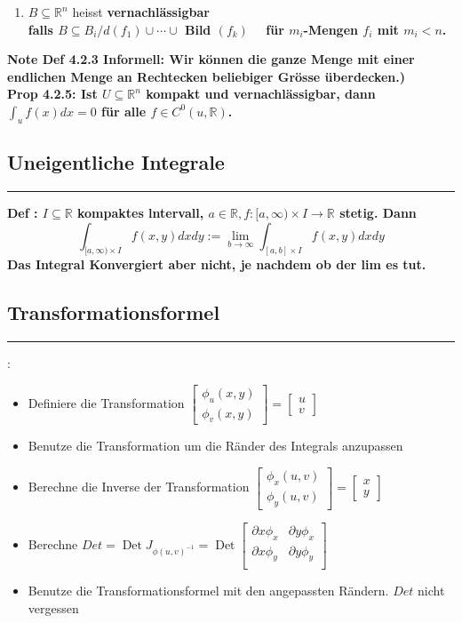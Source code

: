 \documentclass[7pt,landscape, margin = 0.1mm]{article}
\newcommand*{\mysubsection}[1]{\vspace{-2mm}\color{chaptercolor}\subsection{ #1 }
\vspace{-1mm}\hrule\vspace{1.5mm}\color{black}
\vspace{2mm}}
\newcommand{\COL}[1]{ \color{chaptercolor} \bf{#1}\color{black}     \\}
\newcommand{\KRZ}[2]{\vspace{1mm} \hline \vspace{1mm} \color{chaptercolor}{RC #1}:\color{black} \   \hspace{0.2cm}\vspace{1mm}   {\begin{minipage}{20em}
#2 \end{minipage}} \vspace{1mm}  \hline \vspace{1mm}  \\}
\newcommand{\DEF}[2]{\color{chaptercolor}\bf{Def #1}:\color{black}    \hspace{0.2cm} #2 \\}
\newcommand{\NOTE}[2]{\color{chaptercolor}\bf{Note #1}:\color{black}    \hspace{0.2cm} #2 \\}
\newcommand{\PROP}[2]{\color{chaptercolor}\bf{Prop #1}:\color{black}    \hspace{0.2cm} #2 \\}
\begin{document}
\begin{multicols}{4}
\begin{flushleft}
{\begin{enumerate}
 \item $B \subseteq \mathbb{R}^n$ heisst  \COL{vernachlässigbar} falls
 $B \subseteq B_i / d\left(f_1\right) \cup \cdots \cup$ Bild $\left(f_k\right) \quad$ für $m_i$-Mengen $f_i$ mit $m_i<n$.
\end{enumerate}
}

\NOTE{Def 4.2.3 Informell}{ Wir können die ganze Menge mit
einer endlichen Menge an Rechtecken beliebiger
Grösse überdecken.)}
\PROP{4.2.5}{ Ist $U \subseteq \mathbb{R}^n$ kompakt und vernachlässigbar, dann $\int_u f(x) d x=0$ für alle $f \in C^0(u, \mathbb{R})$.}

\mysubsection{Uneigentliche Integrale}



\DEF{}{ $I \subseteq \mathbb{R}$ kompaktes lntervall, $a \in \mathbb{R}, f:[a, \infty) \times I \rightarrow \mathbb{R}$ stetig. Dann
 $$
 \int_{[a, \infty) \times I} f(x, y) d x d y:=\lim _{b \rightarrow \infty} \int_{[a, b] \times I} f(x, y) d x d y
 $$
Das Integral Konvergiert aber nicht, je nachdem ob der lim es tut.}



\mysubsection{Transformationsformel}

\KRZ{Transformation}{

\begin{itemize}
\item Definiere die Transformation 
$  \begin{bmatrix}
\phi_u(x,y) \\ \phi_v(x,y)
\end{bmatrix} =\begin{bmatrix}
u \\ v
\end{bmatrix} $
\item Benutze die Transformation um die Ränder des Integrals anzupassen
\item Berechne die Inverse der Transformation
$  \begin{bmatrix}
\phi_x(u,v) \\ \phi_y(u,v)
\end{bmatrix} =\begin{bmatrix}
x \\ y
\end{bmatrix} $
\item Berechne $Det = \operatorname{Det}\mathcal{}J_{\phi(u,v)^{-1}}=\operatorname{Det} \begin{bmatrix}
\partial x \phi_x & \partial y \phi_x \\
\partial x \phi_y & \partial y \phi_y \\
\end{bmatrix}$
\item Benutze die Transformationsformel mit den angepassten Rändern. \colorbox{yellow!30}{$Det$ nicht vergessen}
\end{itemize} 



}
\end{flushleft}
\end{multicols}
\end{document}
